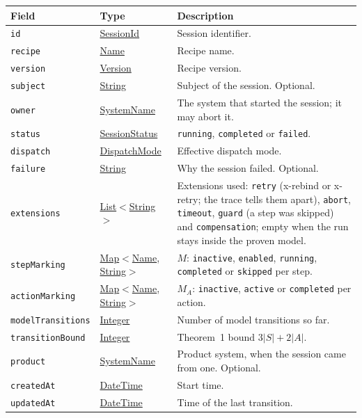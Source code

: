 \documentclass[a4paper]{arrowhead}
\newcommand{\mref}[1]{{\textcolor{ArrowheadPurple}{\hyperref[sec:model:#1]{#1}}}}
\newcommand{\pref}[1]{{\textcolor{ArrowheadGrey}{\hyperref[sec:model:primitives:#1]{#1}}}}
\begin{document}
{\small
\begin{longtable}{|p{3.9cm}|p{4.4cm}|p{7.5cm}|}

\hline
\rowcolor{gray!33} Field & Type & Description \\ \hline
\endhead
\texttt{id} & \pref{SessionId} & Session identifier. \\ \hline
\texttt{recipe} & \pref{Name} & Recipe name. \\ \hline
\texttt{version} & \pref{Version} & Recipe version. \\ \hline
\texttt{subject} & \pref{String} & Subject of the session. Optional. \\ \hline
\texttt{owner} & \pref{SystemName} & The system that started the session; it may abort it. \\ \hline
\texttt{status} & \mref{SessionStatus} & \texttt{running}, \texttt{completed} or \texttt{failed}. \\ \hline
\texttt{dispatch} & \mref{DispatchMode} & Effective dispatch mode. \\ \hline
\texttt{failure} & \pref{String} & Why the session failed. Optional. \\ \hline
\texttt{extensions} & \pref{List}$<$\pref{String}$>$ & Extensions used: \texttt{retry} (x-rebind or x-retry; the trace tells them apart), \texttt{abort}, \texttt{timeout}, \texttt{guard} (a step was skipped) and \texttt{compensation}; empty when the run stays inside the proven model. \\ \hline
\texttt{stepMarking} & \pref{Map}$<$\pref{Name}, \pref{String}$>$ & $M$: \texttt{inactive}, \texttt{enabled}, \texttt{running}, \texttt{completed} or \texttt{skipped} per step. \\ \hline
\texttt{actionMarking} & \pref{Map}$<$\pref{Name}, \pref{String}$>$ & $M_A$: \texttt{inactive}, \texttt{active} or \texttt{completed} per action. \\ \hline
\texttt{model\allowbreak{}Transitions} & \pref{Integer} & Number of model transitions so far. \\ \hline
\texttt{transition\allowbreak{}Bound} & \pref{Integer} & Theorem~1 bound $3|S| + 2|A|$. \\ \hline
\texttt{product} & \pref{SystemName} & Product system, when the session came from one. Optional. \\ \hline
\texttt{createdAt} & \pref{DateTime} & Start time. \\ \hline
\texttt{updatedAt} & \pref{DateTime} & Time of the last transition. \\ \hline
\end{longtable}
}
\end{document}
